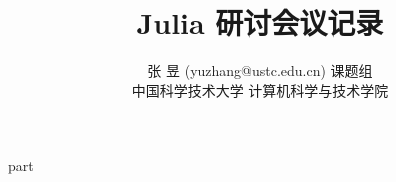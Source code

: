 \documentclass[a4paper,11pt,titlepage]{article}
\begin{document}
\title{Julia 研讨会议记录}

\author{
\rm 张 昱 (yuzhang@ustc.edu.cn) 课题组\\
中国科学技术大学 计算机科学与技术学院
}

\maketitle
\tableofcontents
\setcounter{tocdepth}{3}
\newpage
{}

{part}
\newpage
\begin{footnotesize}
\nocite{*}

\end{footnotesize}
\end{document}
